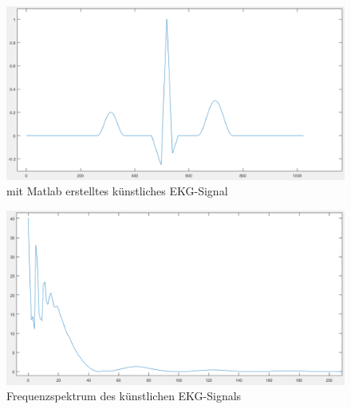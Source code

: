 \begin{figure} [!h]
	\includegraphics[width=\textwidth] {EKG_Signal.png}
	\caption{mit Matlab erstelltes künstliches EKG-Signal}
	\label{fig1} 
\end{figure}

\begin{figure} [!h]
	\includegraphics[width=\textwidth] {EKG_diskretes_Frequenzspektrum_Ausschnitt.png}
	\caption{Frequenzspektrum des künstlichen EKG-Signals}
	\label{fig2} 
\end{figure}

